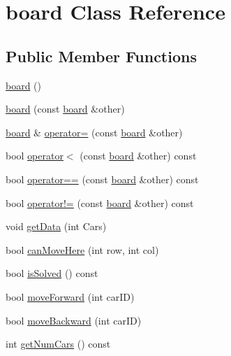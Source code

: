 \hypertarget{classboard}{\section{board Class Reference}
\label{classboard}
}
\subsection*{Public Member Functions}
\begin{DoxyCompactItemize}
\item 
\hyperlink{classboard_a2a97f34e7c9ed8ace6a2508bb2c6e2a2}{board} ()
\item 
\hyperlink{classboard_a9b2a43a4b3b689f2b48916678bc710ed}{board} (const \hyperlink{classboard}{board} \&other)
\item 
\hyperlink{classboard}{board} \& \hyperlink{classboard_ac8999cff8709786df0deeddecc6a4f66}{operator=} (const \hyperlink{classboard}{board} \&other)
\item 
bool \hyperlink{classboard_a060126ff296be3009f381fd526295cae}{operator$<$} (const \hyperlink{classboard}{board} \&other) const 
\item 
bool \hyperlink{classboard_ac19b65622ea5b5e512b685c25efddef6}{operator==} (const \hyperlink{classboard}{board} \&other) const 
\item 
bool \hyperlink{classboard_a10ccb5b5ce48f280c1022b811fb924a4}{operator!=} (const \hyperlink{classboard}{board} \&other) const 
\item 
void \hyperlink{classboard_ac067091c4f62c406b6c9422901f21968}{get\-Data} (int Cars)
\item 
bool \hyperlink{classboard_aaf3f265033e94ae4b0b92fab89184059}{can\-Move\-Here} (int row, int col)
\item 
bool \hyperlink{classboard_a1d6c2df758b84162ee668441aa363fdb}{is\-Solved} () const 
\item 
bool \hyperlink{classboard_afe956f02f71923f2dfb2c55a47ca27e3}{move\-Forward} (int car\-I\-D)
\item 
bool \hyperlink{classboard_a75fd96a9e825a175cf7e5bb785002ec2}{move\-Backward} (int car\-I\-D)
\item 
int \hyperlink{classboard_a42429261e278ab196301eddb448df200}{get\-Num\-Cars} () const 
\end{DoxyCompactItemize}


